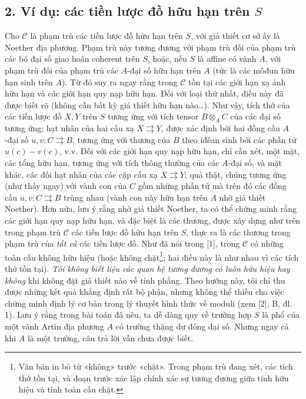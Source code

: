 \subsection*{2. Ví dụ: các tiền lược đồ hữu hạn trên $S$}

Cho $\mathcal C$ là phạm trù các tiền lược đồ hữu hạn trên $S$, với giả thiết
cơ sở ấy là Noether địa phương. Phạm trù này tương đương với phạm trù đối của phạm
trù các bó đại số giao hoán coherent trên $S$, hoặc, nếu $S$ là affine có
vành $A$, với phạm trù đối của phạm trù các $A$-đại số hữu hạn trên $A$ (tức
là các môđun hữu hạn sinh trên $A$). Từ đó suy ra ngay rằng trong $\mathcal C$
tồn tại các giới hạn xạ ảnh hữu hạn và các giới hạn quy nạp hữu hạn. Đối với
loại thứ nhất, điều này đã được biết rõ (không cần bất kỳ giả thiết hữu hạn
nào\ldots). Như vậy, tích thớ của các tiền lược đồ $X,Y$ trên $S$ tương ứng
với tích tensor $B\otimes_A C$ của các đại số tương ứng; hạt nhân của hai cấu
xạ $X\rightrightarrows Y$, được xác định bởi hai đồng cấu $A$-đại số
$u,v:C\rightrightarrows B$, tương ứng với thương của $B$ theo iđêan sinh bởi
các phần tử $u(c)-v(c)$, v.v. Đối với các giới hạn quy nạp hữu hạn, chỉ cần
xét, một mặt, các tổng hữu hạn, tương ứng với tích thông thường của các
$A$-đại số, và mặt khác, các đối hạt nhân của các cặp cấu xạ
$X\rightrightarrows Y$; quả thật, chúng tương ứng (như thấy ngay) với vành con
của $C$ gồm những phần tử mà trên đó các đồng cấu
$u,v:C\rightrightarrows B$ trùng nhau (vành con này hữu hạn trên $A$ nhờ giả
thiết Noether). Hơn nữa, lưu ý rằng nhờ giả thiết Noether, ta có thể chứng
minh rằng các giới hạn quy nạp hữu hạn, và đặc biệt là các thương, được xây
dựng như trên trong phạm trù $\mathcal C$ các tiền lược đồ hữu hạn trên $S$,
thực ra là các thương trong phạm trù của \emph{tất cả} các tiền lược đồ.
Như đã nói trong [1], trong $\mathcal C$ có những toàn cấu không hữu hiệu
(hoặc không chặt\footnote{Văn bản in bỏ từ «không» trước «chặt». Trong phạm
trù đang xét, các tích thớ tồn tại, và đoạn trước xác lập chính xác sự tương
đương giữa tính hữu hiệu và tính toàn cấu chặt.}; hai điều này là như nhau vì
các tích thớ tồn tại). \emph{Tôi không biết liệu các quan hệ tương đương có
luôn hữu hiệu hay không} khi không đặt giả thiết nào về tính phẳng. Theo hướng
này, tôi chỉ thu được những kết quả khẳng định rất bộ phận, nhưng không thể
thiếu cho việc chứng minh định lý cơ bản trong lý thuyết hình thức về moduli
(xem [2], B, đl. 1). Lưu ý rằng trong bài toán đã nêu, ta dễ dàng quy về
trường hợp $S$ là phổ của một vành Artin địa phương $A$ có trường thặng dư
đóng đại số. Nhưng ngay cả khi $A$ là một trường, câu trả lời vẫn chưa được
biết.

